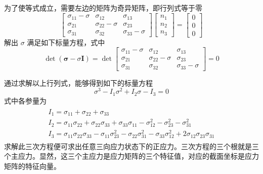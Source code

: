\documentclass[12pt, a4paper]{ctexart}
\begin{document}
为了使等式成立，需要左边的矩阵为奇异矩阵，即行列式等于零
\begin{equation}
\left[ \begin{array}{ccc}{\sigma_{11}-\sigma} & {\sigma_{12}} & {\sigma_{13}} \\ {\sigma_{21}} & {\sigma_{22}-\sigma} & {\sigma_{23}} \\ {\sigma_{31}} & {\sigma_{32}} & {\sigma_{33}-\sigma}\end{array}\right] \left[ \begin{array}{l}{n_{1}} \\ {n_{2}} \\ {n_{3}}\end{array}\right]=\left[ \begin{array}{l}{0} \\ {0} \\ {0}\end{array}\right]
\end{equation}
解出 $ \sigma $ 满足如下标量方程，式中
\begin{equation}
\operatorname{det}(\boldsymbol{\sigma}-\sigma \mathbf{I})=\operatorname{det} \left[ \begin{array}{ccc}{\sigma_{11}-\sigma} & {\sigma_{12}} & {\sigma_{13}} \\ {\sigma_{21}} & {\sigma_{22}-\sigma} & {\sigma_{23}} \\ {\sigma_{31}} & {\sigma_{32}} & {\sigma_{33}-\sigma}\end{array}\right]=0
\end{equation}

通过求解以上行列式，能够得到如下的标量方程
\begin{equation}
\sigma^{3}-I_{1} \sigma^{2}+I_{2} \sigma-I_{3}=0
\end{equation}
式中各参量为
\begin{gather}
\begin{array}{c}{I_{1}=\sigma_{11}+\sigma_{22}+\sigma_{33}} \\ {I_{2}=\sigma_{11} \sigma_{22}+\sigma_{22} \sigma_{33}+\sigma_{33} \sigma_{11}-\sigma_{12}^{2}-\sigma_{23}^{2}-\sigma_{31}^{2}} \\ {I_{3}=\sigma_{11} \sigma_{22} \sigma_{33}-\sigma_{11} \sigma_{23}^{2}-\sigma_{22} \sigma_{31}^{2}-\sigma_{33} \sigma_{12}^{2}+2 \sigma_{12} \sigma_{23} \sigma_{31}}\end{array}
\end{gather}
求解此三次方程便可求出任意三向应力状态下的正应力。三次方程的三个根就是三个主应力。显然，这三个主应力是应力矩阵的三个特征值，对应的截面坐标是应力矩阵的特征向量。
\end{document}
